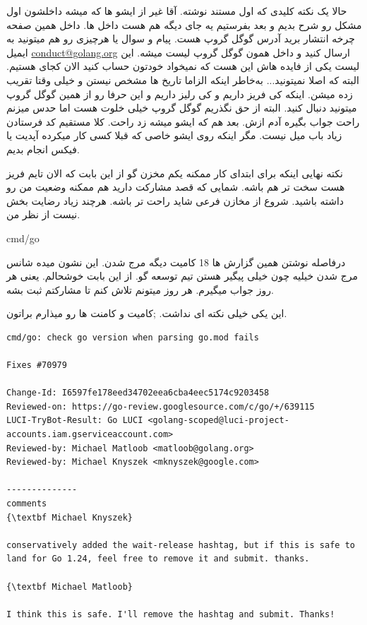 حالا یک نکته کلیدی که اول مستند نوشته. آقا غیر از ایشو ها که میشه داخلشون اول مشکل رو شرح بدیم و بعد \cl  بفرستیم یه جای دیگه هم هست
داخل  ها. داخل همین صفحه چرخه انتشار برید آدرس گوگل گروپ هست. پیام و سوال یا هرچیزی رو هم میتونید به ایمیل
\href{conduct@golang.org}{conduct@golang.org}
ارسال کنید و داخل همون گوگل گروپ لیست میشه. این لیست یکی از فایده هاش این هست که نمیخواد خودتون حساب کنید الان کجای 
هستیم. البته که اصلا نمیتونید... به‌خاطر اینکه الزاما تاریخ ها مشخص نیستن و خیلی وقتا تقریب زده میشن. اینکه کی فریز داریم و کی رلیز داریم و این حرفا
رو از همین گوگل گروپ میتونید دنبال کنید.
البته از حق نگذریم گوگل گروپ خیلی خلوت هست اما حدس میزنم راحت جواب بگیره آدم ازش. بعد هم که ایشو میشه زد راحت. کلا مستقیم کد فرستادن
زیاد باب میل نیست. مگر اینکه روی ایشو خاصی که قبلا کسی کار میکرده آپدیت یا فیکس انجام بدیم.

نکته نهایی اینکه برای ابتدای کار ممکنه یکم مخزن گو از این بابت که الان تایم فریز هست سخت تر هم باشه. شمایی که قصد مشارکت دارید هم ممکنه
وضعیت من رو داشته باشید. شروع از مخازن فرعی شاید راحت تر باشه. هرچند زیاد رضایت بخش نیست از نظر من.


{\LARGE cmd/go}

درفاصله نوشتن همین گزارش ها 18 کامیت دیگه مرج شدن. این نشون میده شانس مرج شدن خیلیه چون خیلی پیگیر هستن تیم توسعه گو.
از این بابت خوشحالم. یعنی هر روز جواب میگیرم. هر روز میتونم تلاش کنم تا مشارکتم ثبت بشه.

این یکی \cl خیلی نکته ای نداشت. ;کامیت و کامنت ها رو میذارم براتون.
\begin{latin}
\begin{verbatim}
cmd/go: check go version when parsing go.mod fails

Fixes #70979

Change-Id: I6597fe178eed34702eea6cba4eec5174c9203458
Reviewed-on: https://go-review.googlesource.com/c/go/+/639115
LUCI-TryBot-Result: Go LUCI <golang-scoped@luci-project-accounts.iam.gserviceaccount.com>
Reviewed-by: Michael Matloob <matloob@golang.org>
Reviewed-by: Michael Knyszek <mknyszek@google.com>

--------------
comments
{\textbf Michael Knyszek}

conservatively added the wait-release hashtag, but if this is safe to land for Go 1.24, feel free to remove it and submit. thanks.

{\textbf Michael Matloob}

I think this is safe. I'll remove the hashtag and submit. Thanks!

\end{verbatim}
\end{latin}

